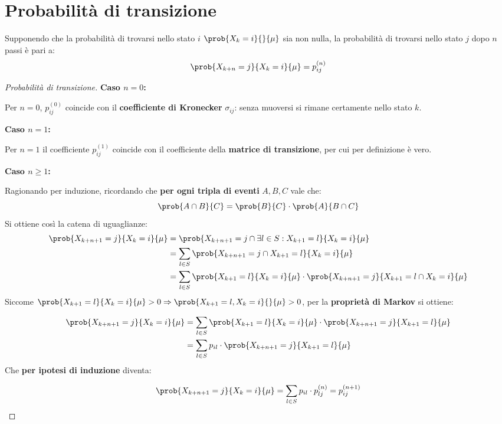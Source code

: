 \documentclass[\main/main.tex]{subfiles}
\begin{document}
\section{Probabilità di transizione}
\begin{theorem}
  Supponendo che la probabilità di trovarsi nello stato \(i\) \(\prob{X_k = i}{}{\mu}\) sia non nulla, la probabilità di trovarsi nello stato \(j\) dopo \(n\) passi è pari a:
  \[
    \prob{X_{k+n}=j}{X_{k}=i}{\mu} = p^{(n)}_{ij}
  \]
\end{theorem}
\begin{proof}[Probabilità di transizione]

  \textbf{Caso \(n=0\):}

  Per \(n=0\), \(p^{(0)}_{ij}\) coincide con il \textbf{coefficiente di Kronecker} \(\sigma_{ij}\): senza muoversi si rimane certamente nello stato \(k\).

  \textbf{Caso \(n=1\):}

  Per \(n=1\) il coefficiente  \(p^{(1)}_{ij}\) coincide con il coefficiente della \textbf{matrice di transizione}, per cui per definizione è vero.

  \textbf{Caso \(n \geq 1\):}

  Ragionando per induzione, ricordando che \textbf{per ogni tripla di eventi} \(A, B, C\) vale che:
  \[
    \prob{A\cap B}{C} = \prob{B}{C}\cdot \prob{A}{B \cap C}
  \]
  Si ottiene così la catena di uguaglianze:
  \begin{align*}
    \prob{X_{k+n+1}=j}{X_k=i}{\mu} & = \prob{X_{k+n+1}=j \cap \exists l \in S: X_{k+1}=l}{X_k=i}{\mu}                                 \\
                                   & = \sum_{l \in S} \prob{X_{k+n+1}=j \cap X_{k+1}=l}{X_k=i}{\mu}                                   \\
                                   & = \sum_{l \in S} \prob{X_{k+1}=l}{X_k=i}{\mu}\cdot \prob{X_{k+n+1}=j}{X_{k+1}=l \cap X_k=i}{\mu} \\
  \end{align*}
  Siccome \(\prob{X_{k+1}=l}{X_k=i}{\mu} > 0 \Rightarrow \prob{X_{k+1}=l, X_k=i}{}{\mu} > 0\), per la \textbf{proprietà di Markov} si ottiene:

  \begin{align*}
    \prob{X_{k+n+1}=j}{X_k=i}{\mu} & = \sum_{l \in S} \prob{X_{k+1}=l}{X_k=i}{\mu}\cdot \prob{X_{k+n+1}=j}{X_{k+1}=l}{\mu} \\
                                   & = \sum_{l \in S} p_{il}\cdot \prob{X_{k+n+1}=j}{X_{k+1}=l}{\mu}
  \end{align*}
  Che \textbf{per ipotesi di induzione} diventa:

  \[
    \prob{X_{k+n+1}=j}{X_k=i}{\mu} = \sum_{l \in S} p_{il}\cdot p^{(n)}_{lj} = p^{(n+1)}_{ij}
  \]


\end{proof}
\end{document}
